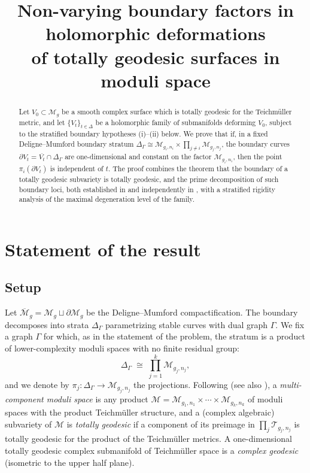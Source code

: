 \documentclass[11pt]{amsart}
\theoremstyle{definition}
\theoremstyle{remark}
\newcommand{\M}{\mathcal{M}}
\newcommand{\T}{\mathcal{T}}
\begin{document}
\title{Non-varying boundary factors in holomorphic deformations\\
of totally geodesic surfaces in moduli space}

\author{}
\date{}

\begin{abstract}
Let $V_0\subset \M_g$ be a smooth complex surface which is totally geodesic
for the Teichm\"uller metric, and let $\{V_t\}_{t\in\Delta}$ be a holomorphic
family of submanifolds deforming $V_0$, subject to the stratified boundary
hypotheses (i)--(ii) below. We prove that if, in a fixed Deligne--Mumford
boundary stratum $\Delta_\Gamma\cong \M_{g_i,n_i}\times\prod_{j\neq i}
\M_{g_j,n_j}$, the boundary curves $\partial V_t=\overline{V_t}\cap
\Delta_\Gamma$ are one-dimensional and constant on the factor
$\M_{g_i,n_i}$, then the point $\pi_i(\partial V_t)$ is independent of $t$.
The proof combines the theorem that the boundary of a totally geodesic
subvariety is totally geodesic, and the prime decomposition of such boundary
loci, both established in \cite{Boundary} and independently in \cite{AW},
with a stratified rigidity analysis of the maximal degeneration level of the
family.
\end{abstract}

\maketitle

\section{Statement of the result}\label{sec:statement}

\subsection{Setup}
Let $\overline{\M}_g=\M_g\sqcup\partial\M_g$ be the Deligne--Mumford
compactification. The boundary decomposes into strata $\Delta_\Gamma$
parametrizing stable curves with dual graph $\Gamma$. We fix a graph
$\Gamma$ for which, as in the statement of the problem, the stratum is a
product of lower-complexity moduli spaces with no finite residual group:
\[
\Delta_\Gamma \;\cong\; \prod_{j=1}^{k}\M_{g_j,n_j},
\]
and we denote by $\pi_j:\Delta_\Gamma\to \M_{g_j,n_j}$ the projections.
Following \cite[\S 1--2]{Boundary} (see also \cite[\S 1]{AW}), a
\emph{multi-component moduli space} is any product
$\mathcal{M}=\M_{g_1,n_1}\times\cdots\times\M_{g_k,n_k}$ of moduli spaces
with the product Teichm\"uller structure, and a (complex algebraic)
subvariety of $\mathcal{M}$ is \emph{totally geodesic} if a component of its
preimage in $\prod_j\T_{g_j,n_j}$ is totally geodesic for the product of the
Teichm\"uller metrics. A one-dimensional totally geodesic complex submanifold
of Teichm\"uller space is a \emph{complex geodesic} (isometric to the upper
half plane).
\end{document}
